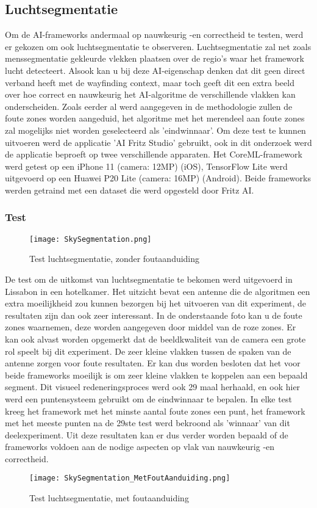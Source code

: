 \subsection{Luchtsegmentatie}
Om de AI-frameworks andermaal op nauwkeurig -en correctheid te testen, werd er gekozen om ook luchtsegmentatie te observeren. Luchtsegmentatie zal net zoals menssegmentatie gekleurde vlekken plaatsen over de regio's waar het framework lucht detecteert. Alsook kan u bij deze AI-eigenschap denken dat dit geen direct verband heeft met de wayfinding context, maar toch geeft dit een extra beeld over hoe correct en nauwkeurig het AI-algoritme de verschillende vlakken kan onderscheiden. Zoals eerder al werd aangegeven in de methodologie zullen de foute zones worden aangeduid, het algoritme met het merendeel aan foute zones zal mogelijks niet worden geselecteerd als 'eindwinnaar'. Om deze test te kunnen uitvoeren werd de applicatie 'AI Fritz Studio' gebruikt, ook in dit onderzoek werd de applicatie beproeft op twee verschillende apparaten. Het CoreML-framework werd getest op een iPhone 11 (camera: 12MP) (iOS), TensorFlow Lite werd uitgevoerd op een Huawei P20 Lite (camera: 16MP) (Android). Beide frameworks werden getraind met een dataset die werd opgesteld door Fritz AI.

\subsubsection{Test}
\begin{figure}[H]
	\centering
	\texttt{[image: SkySegmentation.png]}
	\caption{Test luchtsegmentatie, zonder foutaanduiding}
\end{figure}
\pagebreak
De test om de uitkomst van luchtsegmentatie te bekomen werd uitgevoerd in Lissabon in een hotelkamer. Het uitzicht bevat een antenne die de algoritmen een extra moeilijkheid zou kunnen bezorgen bij het uitvoeren van dit experiment, de resultaten zijn dan ook zeer interessant. In de onderstaande foto kan u de foute zones waarnemen, deze worden  aangegeven door middel van de roze zones. Er kan ook alvast worden opgemerkt dat de beeldkwaliteit van de camera een grote rol speelt bij dit experiment. De zeer kleine vlakken tussen de spaken van de antenne zorgen voor foute resultaten. Er kan dus worden besloten dat het voor beide frameworks moeilijk is om zeer kleine vlakken te koppelen aan een bepaald segment. Dit visueel redeneringsproces werd ook 29 maal herhaald, en ook hier werd een puntensysteem gebruikt om de eindwinnaar te bepalen. In elke test kreeg het framework met het minste aantal foute zones een punt, het framework met het meeste punten na de 29ste test werd bekroond als 'winnaar' van dit deelexperiment. Uit deze resultaten kan er dus verder worden bepaald of de frameworks voldoen aan de nodige aspecten op vlak van nauwkeurig -en correctheid.
\begin{figure}[H]
	\centering
	\texttt{[image: SkySegmentation\_MetFoutAanduiding.png]}
	\caption{Test luchtsegmentatie, met foutaanduiding}
\end{figure}

